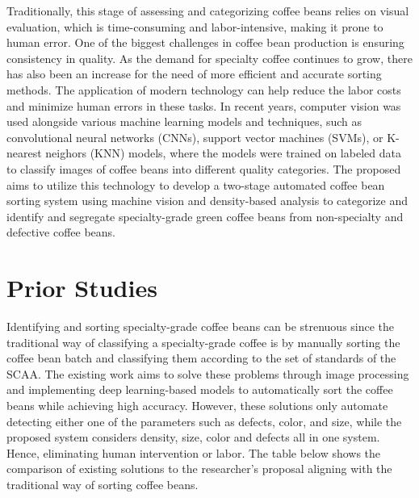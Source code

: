 Traditionally, this stage of assessing and categorizing coffee beans relies on visual evaluation, which is time-consuming and labor-intensive, making it prone to human error. One of the biggest challenges in coffee bean production is ensuring consistency in quality. As the demand for specialty coffee continues to grow, there has also been an increase for the need of more efficient and accurate sorting methods. The application of modern technology can help reduce the labor costs and minimize human errors in these tasks. In recent years, computer vision was used alongside various machine learning models and techniques, such as convolutional neural networks (CNNs), support vector machines (SVMs), or K-nearest neighors (KNN) models, where the models were trained on labeled data to classify images of coffee beans into different quality categories. The proposed aims to utilize this technology to develop a two-stage automated coffee bean sorting system using machine vision and density-based analysis to categorize and identify and segregate specialty-grade green coffee beans from non-specialty and defective coffee beans. 

\section{Prior Studies}
Identifying and sorting specialty-grade coffee beans can be strenuous since the traditional way of classifying a specialty-grade coffee is by manually sorting the coffee bean batch and classifying them according to the set of standards of the SCAA. The existing work aims to solve these problems through image processing and implementing deep learning-based models to automatically sort the coffee beans while achieving high accuracy. However, these solutions only automate detecting either one of the parameters such as defects, color, and size, while the proposed system considers density, size, color and defects all in one system. Hence, eliminating human intervention or labor. The table below shows the comparison of existing solutions to the researcher’s proposal aligning with the traditional way of sorting coffee beans. 

